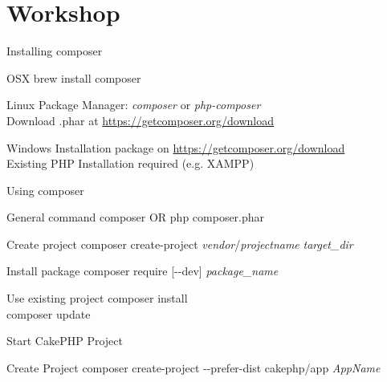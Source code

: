 \section{Workshop}


\begin{frame}{Installing composer}
	
	\begin{block}{OSX}
		brew install composer
	\end{block}
      
	\begin{alertblock}{Linux}
		Package Manager: \textit{composer} or \textit{php-composer} ~\\
		Download .phar at \url{https://getcomposer.org/download}
	\end{alertblock}
      
	\begin{exampleblock}{Windows}
		Installation package on \url{https://getcomposer.org/download} ~\\
		Existing PHP Installation required (e.g. XAMPP)
	\end{exampleblock}
\end{frame}

\begin{frame}{Using composer}
	
	\begin{block}{General command}
		composer OR php composer.phar
	\end{block}
	
	\begin{block}{Create project}
		composer create-project \textit{vendor}/\textit{projectname} \textit{target\_dir}
	\end{block}
	
	\begin{block}{Install package}
		composer require [-{}-dev] \textit{package\_name}
	\end{block}
	
	\begin{block}{Use existing project}
		composer install ~\\
		composer update
	\end{block}
	
\end{frame}

\begin{frame}{Start CakePHP Project}
	
	\begin{block}{Create Project}
		composer create-project -{}-prefer-dist cakephp/app \textit{AppName}
	\end{block}
\end{frame}